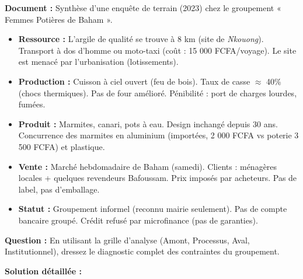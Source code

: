 \documentclass[11pt]{article}
\begin{document}
\begin{exoresolu}
\textbf{Document :} Synthèse d'une enquête de terrain (2023) chez le groupement « Femmes Potières de Baham ».
\begin{itemize}
    \item \textbf{Ressource :} L'argile de qualité se trouve à 8 km (site de \textit{Nkouong}). Transport à dos d'homme ou moto-taxi (coût : 15 000 FCFA/voyage). Le site est menacé par l'urbanisation (lotissements).
    \item \textbf{Production :} Cuisson à ciel ouvert (feu de bois). Taux de casse $\approx$ 40\% (chocs thermiques). Pas de four amélioré. Pénibilité : port de charges lourdes, fumées.
    \item \textbf{Produit :} Marmites, canari, pots à eau. Design inchangé depuis 30 ans. Concurrence des marmites en aluminium (importées, 2 000 FCFA vs poterie 3 500 FCFA) et plastique.
    \item \textbf{Vente :} Marché hebdomadaire de Baham (samedi). Clients : ménagères locales + quelques revendeurs Bafoussam. Prix imposés par acheteurs. Pas de label, pas d'emballage.
    \item \textbf{Statut :} Groupement informel (reconnu mairie seulement). Pas de compte bancaire groupé. Crédit refusé par microfinance (pas de garanties).
\end{itemize}

\textbf{Question :} En utilisant la grille d'analyse (Amont, Processus, Aval, Institutionnel), dressez le diagnostic complet des contraintes du groupement.

\tcblower
\textbf{Solution détaillée :}


\end{exoresolu}
\end{document}
